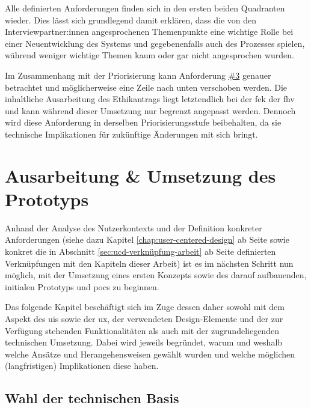 \documentclass[a4paper,12pt,twoside,numbers=noendperiod]{scrreprt}
\begin{document}
Alle definierten Anforderungen finden sich in den ersten beiden Quadranten wieder. Dies lässt sich grundlegend damit erklären, dass die von den Interviewpartner:innen angesprochenen Themenpunkte eine wichtige Rolle bei einer Neuentwicklung des Systems und gegebenenfalls auch des Prozesses spielen, während weniger wichtige Themen kaum oder gar nicht angesprochen wurden.

\medskip

Im Zusammenhang mit der Priorisierung kann Anforderung \hyperref[sub-sub-sec:abgeleitete-anforderungen-während-erstellung-einreichung]{\#3} genauer betrachtet und möglicherweise eine Zeile nach unten verschoben werden. Die inhaltliche Ausarbeitung des Ethikantrags liegt letztendlich bei der \ac{fek} der \ac{fhv} und kann während dieser Umsetzung nur begrenzt angepasst werden. Dennoch wird diese Anforderung in derselben Priorisierungsstufe beibehalten, da sie technische Implikationen für zukünftige Änderungen mit sich bringt.

\cleardoublepage
\chapter{Ausarbeitung \& Umsetzung des Prototyps}
\label{chap:ausarbeitung-umsetzung-prototyp}

Anhand der Analyse des Nutzerkontexts und der Definition konkreter Anforderungen (siehe dazu Kapitel \ref{chap:user-centered-design} ab Seite \pageref{chap:user-centered-design} sowie konkret die in Abschnitt \ref{sec:ucd-verknüpfung-arbeit} ab Seite \pageref{sec:ucd-verknüpfung-arbeit} definierten Verknüpfungen mit den Kapiteln dieser Arbeit) ist es im nächsten Schritt nun möglich, mit der Umsetzung eines ersten Konzepts sowie des darauf aufbauenden, initialen Prototyps und \aclp{poc} zu beginnen.

Das folgende Kapitel beschäftigt sich im Zuge dessen daher sowohl mit dem Aspekt des \aclp{ui} sowie der \ac{ux}, der verwendeten Design-Elemente und der zur Verfügung stehenden Funktionalitäten als auch mit der zugrundeliegenden technischen Umsetzung. Dabei wird jeweils begründet, warum und weshalb welche Ansätze und Herangehensweisen gewählt wurden und welche möglichen (langfristigen) Implikationen diese haben.

\section{Wahl der technischen Basis}
\label{sec:ausarbeitung-wahl-technische-basis}
\end{document}
